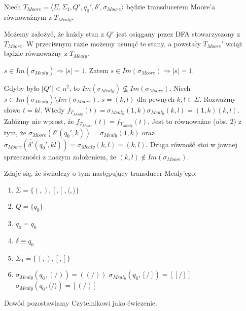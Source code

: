 \documentclass[a4paper,11pt]{article}
\newenvironment{zadanie}[1]
  {\renewcommand\theinnercustomthm{#1}\innercustomthm}
  {\endinnercustomthm}
\newenvironment{obserwacja}[1]
  {\renewcommand\theinnercustomobs{#1}\innercustomobs}
  {\endinnercustomobs}
\begin{document}
Niech $T_{Moore} = \langle \Sigma, \Sigma_1, Q', q_0', \delta', \sigma_{Moore} \rangle$ będzie transducerem Moore'a 
równoważnym z $T_{Mealy}$.

\begin{obserwacja}{1}
 Możemy założyć, że każdy stan z $Q'$ jest osiągany przez DFA stowarzyszony z $T_{Moore}$. W przeciwnym razie możemy usunąć te 
 stany, a powstały $T_{Moore}'$ wciąż będzie równoważny z $T_{Mealy}$.
\end{obserwacja}

\begin{obserwacja}{2}
 $s \in Im(\sigma_{Mealy}) \Rightarrow |s| = 1$. Zatem $s \in Im(\sigma_{Moore}) \Rightarrow |s| = 1$.
\end{obserwacja}

Gdyby było $|Q'| < n^2$, to $Im(\sigma_{Mealy}) \nsubseteq Im(\sigma_{Moore})$. Niech 
$s \in Im(\sigma_{Mealy}) \setminus Im(\sigma_{Moore})$. $s = (k,l)$ dla pewnych $k,l \in \Sigma$. Rozważmy słowo
$t = kl$. Wtedy $f_{T_{Mealy}}(t) = \sigma_{Mealy}(1,k) \sigma_{Mealy}(k,l) = (1,k)(k,l)$. \\
Załóżmy nie wprost, że $f_{T_{Moore}}(t) = f_{T_{Mealy}}(t)$. Jest to równoważne (obs. 2) z tym, że 
$\sigma_{Moore}(\delta'(q_0',k)) = \sigma_{Mealy}(1,k)$ oraz 
$\sigma_{Moore}(\widehat{\delta'}(q_0',kl)) = \sigma_{Mealy}(k,l) = (k,l)$. 
Druga równość stoi w jawnej sprzeczności z naszym założeniem, że $(k,l) \notin Im(\sigma_{Moore})$.

\begin{zadanie}{80}
\end{zadanie}
Zdaje się, że świadczy o tym następujący transducer Mealy'ego:
\begin{enumerate}
 \item $\Sigma = \{(,),[,],\langle,\rangle \}$
 \item $Q = \{q_0\}$
 \item $q_0 = q_0$
 \item $\delta \equiv q_0$
 \item $\Sigma_1 = \{(,),[,] \}$
 \item
 \subitem $\sigma_{Mealy}( q_0, (/) ) = ((/)) $
 \subitem $\sigma_{Mealy}( q_0, [/] ) = [[/]] $
 \subitem $\sigma_{Mealy}( q_0, \langle / \rangle ) = [(/)] $
\end{enumerate}
Dowód pozostawiamy Czytelnikowi jako ćwiczenie. 
 
\end{document}
